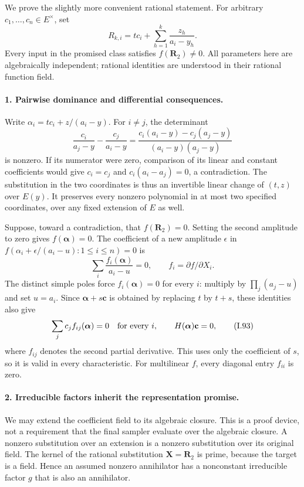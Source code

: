 We prove the slightly more convenient rational statement. For
arbitrary $c_1,\ldots,c_n\in E^\times$, set
\[
 R_{k,i}=t c_i+\sum_{h=1}^{k}\frac{z_h}{a_i-y_h}.
 \tag{I.91}
\]
Every input in the promised class satisfies $f(\mathbf R_2)\ne0$.
All parameters here are algebraically independent; rational
identities are understood in their rational function field.

\paragraph{1. Pairwise dominance and differential consequences.}
Write $\alpha_i=t c_i+z/(a_i-y)$. For $i\ne j$, the determinant
\[
 \frac{c_i}{a_j-y}-\frac{c_j}{a_i-y}
 =\frac{c_i(a_i-y)-c_j(a_j-y)}{(a_i-y)(a_j-y)}
 \tag{I.92}
\]
is nonzero. If its numerator were zero, comparison of its linear
and constant coefficients would give $c_i=c_j$ and
$c_i(a_i-a_j)=0$, a contradiction. The substitution in the two
coordinates is thus an invertible linear change of $(t,z)$ over
$E(y)$. It preserves every nonzero polynomial in at most two
specified coordinates, over any fixed extension of $E$ as well.

Suppose, toward a contradiction, that $f(\mathbf R_2)=0$. Setting
the second amplitude to zero gives $f(\boldsymbol\alpha)=0$.
The coefficient of a new amplitude $\epsilon$ in
$f(\alpha_i+\epsilon/(a_i-u):1\le i\le n)=0$ is
\[
 \sum_i\frac{f_i(\boldsymbol\alpha)}{a_i-u}=0,
 \qquad f_i=\partial f/\partial X_i.
\]
The distinct simple poles force $f_i(\boldsymbol\alpha)=0$ for
every $i$: multiply by $\prod_j(a_j-u)$ and set $u=a_i$.
Since $\boldsymbol\alpha+s\mathbf c$ is obtained by replacing
$t$ by $t+s$, these identities also give
\[
 \sum_j c_j f_{ij}(\boldsymbol\alpha)=0
 \quad\hbox{for every }i,
 \qquad H(\boldsymbol\alpha)\mathbf c=0,
 \tag{I.93}
\]
where $f_{ij}$ denotes the second partial derivative. This uses
only the coefficient of $s$, so it is valid in every characteristic.
For multilinear $f$, every diagonal entry $f_{ii}$ is zero.

\paragraph{2. Irreducible factors inherit the representation promise.}
We may extend the coefficient field to its algebraic closure.
This is a proof device, not a requirement that the final sampler
evaluate over the algebraic closure. A nonzero substitution over
an extension is a nonzero substitution over its original field.
The kernel of the rational substitution $\mathbf X=\mathbf R_2$
is prime, because the target is a field. Hence an assumed nonzero
annihilator has a nonconstant irreducible factor $g$ that is also
an annihilator.

